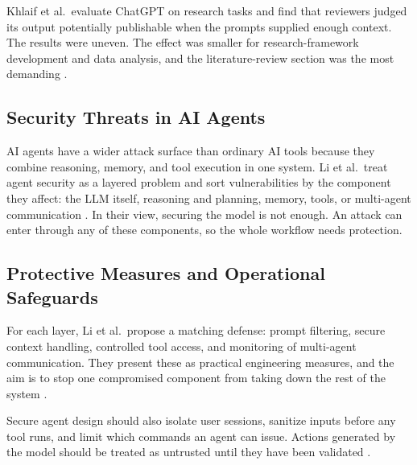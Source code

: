 \documentclass[sn-basic,Numbered]{sn-jnl}
\begin{document}
Khlaif et al.\ evaluate ChatGPT on research tasks and find that reviewers judged its output potentially publishable when the prompts supplied enough context. The results were uneven. The effect was smaller for research-framework development and data analysis, and the literature-review section was the most demanding \cite{khlaif2023chatgpt}.

\subsection{Security Threats in AI Agents}

AI agents have a wider attack surface than ordinary AI tools because they combine reasoning, memory, and tool execution in one system. Li et al.\ treat agent security as a layered problem and sort vulnerabilities by the component they affect: the LLM itself, reasoning and planning, memory, tools, or multi-agent communication \cite{li2025agentsecurity}. In their view, securing the model is not enough. An attack can enter through any of these components, so the whole workflow needs protection.

\subsection{Protective Measures and Operational Safeguards}

For each layer, Li et al.\ propose a matching defense: prompt filtering, secure context handling, controlled tool access, and monitoring of multi-agent communication. They present these as practical engineering measures, and the aim is to stop one compromised component from taking down the rest of the system \cite{li2025agentsecurity}.

Secure agent design should also isolate user sessions, sanitize inputs before any tool runs, and limit which commands an agent can issue. Actions generated by the model should be treated as untrusted until they have been validated \cite{he2025security}.
\end{document}
